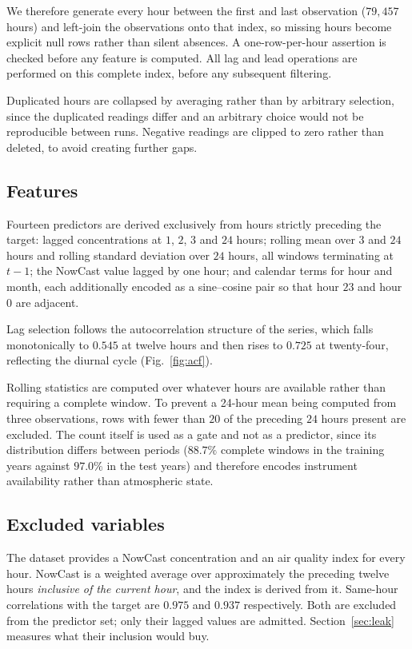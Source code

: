 \documentclass[conference,a4paper]{IEEEtran}
\begin{document}
We therefore generate every hour between the first and last observation
($79{,}457$ hours) and left-join the observations onto that index, so missing
hours become explicit null rows rather than silent absences. A one-row-per-hour
assertion is checked before any feature is computed. All lag and lead operations
are performed on this complete index, before any subsequent filtering.

Duplicated hours are collapsed by averaging rather than by arbitrary selection,
since the duplicated readings differ and an arbitrary choice would not be
reproducible between runs. Negative readings are clipped to zero rather than
deleted, to avoid creating further gaps.

\subsection{Features}
Fourteen predictors are derived exclusively from hours strictly preceding the
target: lagged concentrations at $1$, $2$, $3$ and $24$ hours; rolling mean over
$3$ and $24$ hours and rolling standard deviation over $24$ hours, all windows
terminating at $t-1$; the NowCast value lagged by one hour; and calendar terms
for hour and month, each additionally encoded as a sine--cosine pair so that
hour $23$ and hour $0$ are adjacent.

Lag selection follows the autocorrelation structure of the series, which falls
monotonically to $0.545$ at twelve hours and then rises to $0.725$ at
twenty-four, reflecting the diurnal cycle (Fig.~\ref{fig:acf}).

Rolling statistics are computed over whatever hours are available rather than
requiring a complete window. To prevent a 24-hour mean being computed from three
observations, rows with fewer than $20$ of the preceding $24$ hours present are
excluded. The count itself is used as a gate and not as a predictor, since its
distribution differs between periods ($88.7\%$ complete windows in the training
years against $97.0\%$ in the test years) and therefore encodes instrument
availability rather than atmospheric state.

\subsection{Excluded variables}
The dataset provides a NowCast concentration and an air quality index for every
hour. NowCast is a weighted average over approximately the preceding twelve
hours \emph{inclusive of the current hour}, and the index is derived from it.
Same-hour correlations with the target are $0.975$ and $0.937$ respectively.
Both are excluded from the predictor set; only their lagged values are admitted.
Section~\ref{sec:leak} measures what their inclusion would buy.
\end{document}
